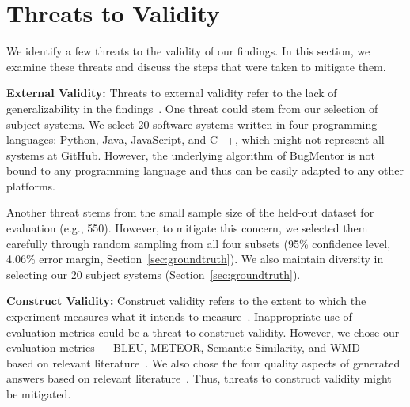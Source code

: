 \section{Threats to Validity} \label{Chap1:Threats}
We identify a few threats to the validity of our findings. In this section, we examine these threats and discuss the steps that were taken to mitigate them.\par

\textbf{External Validity:}
Threats to external validity refer to the lack of generalizability in the findings~\cite{ferguson2004external}. One threat could stem from our selection of subject systems. We select 20 software systems written in four programming languages: Python, Java, JavaScript, and C++, which might not represent all systems at GitHub. However, the underlying algorithm of BugMentor is not bound to any programming language and thus can be easily adapted to any other platforms.\par
Another threat stems from the small sample size of the held-out dataset for evaluation (e.g., 550). However, to mitigate this concern, we selected them carefully through random sampling from all four subsets (95\% confidence level, 4.06\% error margin, Section~\ref{sec:groundtruth}). We also maintain diversity in selecting our 20 subject systems (Section~\ref{sec:groundtruth}). 

\textbf{Construct Validity:} Construct validity refers to the extent to which the experiment measures what it intends to measure~\cite{smith2005construct}. 
Inappropriate use of evaluation metrics could be a threat to construct validity. However, we chose our evaluation metrics --- BLEU, METEOR, Semantic Similarity, and WMD --- based on relevant literature~\cite{papineni2002bleu,banerjee2005meteor,haque2022semantic,huang2016supervised}. We also chose the four quality aspects of generated answers based on relevant literature~\cite{imran2021automatically,joshi2015likert}. Thus, threats to construct validity might be mitigated.

